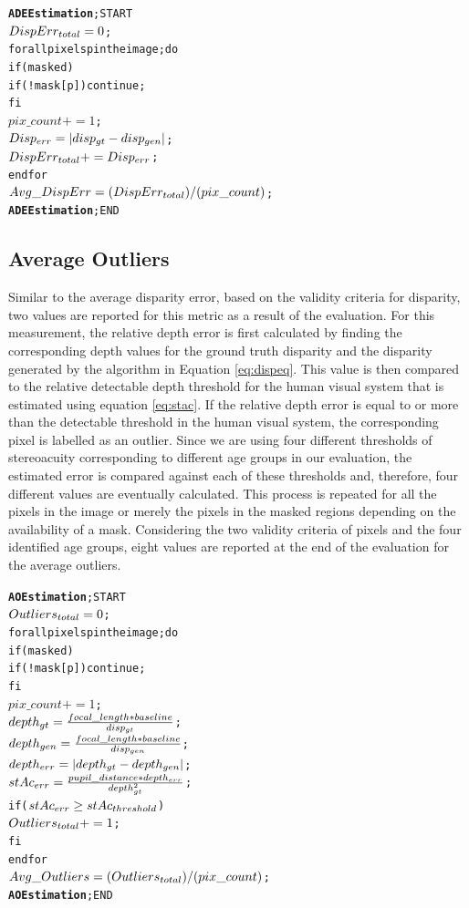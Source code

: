 \begin{alltt}
\textbf{ADE Estimation}; START
   \(DispErr\sb{total}=0\);
   for all pixels p in the image; do
      if (masked)
         if(!mask[p]) continue;
      fi
      \(pix\_count += 1\);
      \(Disp\sb{err} = |disp\sb{gt}-disp\sb{gen}|\);
      \(DispErr\sb{total} += Disp\sb{err}\);
  end for
   \(Avg\_DispErr = (DispErr\sb{total})/(pix\_count)\);
\textbf{ADE Estimation}; END
\end{alltt}

\subsection{Average Outliers}
Similar to the average disparity error, based on the validity criteria for disparity, 
two values are reported for this metric as a result of the evaluation. For this measurement, the relative depth error is first calculated by finding the corresponding depth values
for the ground truth disparity and the disparity generated by the algorithm in Equation \ref{eq:dispeq}. This value is then compared to the relative 
detectable depth threshold for the human visual system that is estimated using
equation \ref{eq:stac}. If the relative depth error is equal to or more than the detectable threshold in the human visual system,
the corresponding pixel is labelled as an outlier. Since we are using four different thresholds of stereoacuity corresponding to different
age groups in our evaluation, the estimated error is compared against each of these thresholds and, therefore,
four different values are eventually calculated. This process is repeated for all the pixels in the image or 
merely the pixels in the masked regions depending on the availability of a mask.
Considering the two validity criteria of pixels and the four identified age groups, 
eight values are reported at the end of the evaluation for the average outliers.

\begin{alltt}
\textbf{AO Estimation}; START
   \(Outliers\sb{total} = 0\);
   for all pixels p in the image; do
         if (masked)
            if(!mask[p]) continue;
         fi
         \(pix\_count += 1\);
         \(depth\sb{gt} = \frac{focal\_length * baseline}{disp\sb{gt}}\);
         \(depth\sb{gen} = \frac{focal\_length * baseline}{disp\sb{gen}}\);
         \(depth\sb{err} = |depth\sb{gt}-depth\sb{gen}|\);
         \(stAc\sb{err} = \frac{pupil\_distance*depth\sb{err}}{depth\sb{gt}\sp{2}}\);
         if (\(stAc\sb{err} \geq stAc\sb{threshold}\))
            \(Outliers\sb{total} += 1\);
         fi
   end for
   \(Avg\_Outliers = (Outliers\sb{total})/(pix\_count)\);
\textbf{AO Estimation}; END
\end{alltt}

